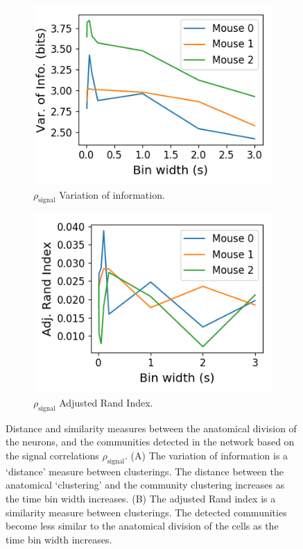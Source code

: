   \begin{figure}[h]
    \begin{subfigure}[h]{0.5\linewidth}
      \includegraphics[width=\linewidth]{figures/eight_probe/variation_of_information_rectified_signal.png}
      \caption{$\rho_{\text{signal}}$ Variation of information.}
      \label{fig:variation_of_information_rectified_signal}
    \end{subfigure}
    \begin{subfigure}[h]{0.5\linewidth}
      \includegraphics[width=\linewidth]{figures/eight_probe/adjusted_rand_index_rectified_signal.png}
      \caption{$\rho_{\text{signal}}$ Adjusted Rand Index.}
      \label{fig:adjusted_rand_index_rectified_signal}
    \end{subfigure}
    \caption{Distance and similarity measures between the anatomical division of the neurons, and the communities detected in the network based on the signal correlations $\rho_{\text{signal}}$. (A) The variation of information is a `distance' measure between clusterings. The distance between the anatomical `clustering' and the community clustering increases as the time bin width increases. (B) The adjusted Rand index is a similarity measure between clusterings. The detected communities become less similar to the anatomical division of the cells as the time bin width increases.}
    \label{fig:signal_clustering_distance_measures}
  \end{figure}

